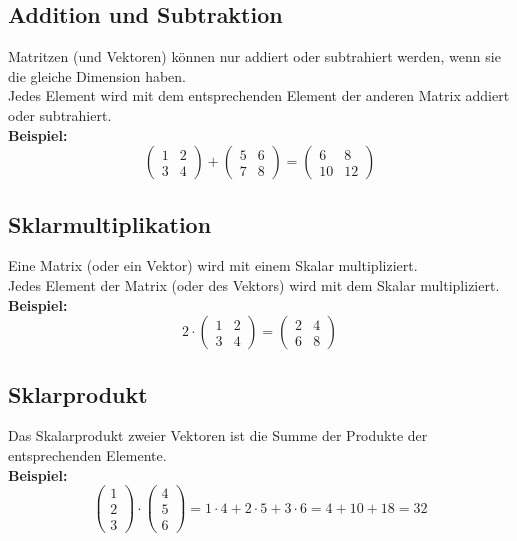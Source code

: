 \documentclass[12pt,a4paper]{article}
\begin{document}
\subsection{Addition und Subtraktion}
Matritzen (und Vektoren) können nur addiert oder subtrahiert werden, wenn sie die gleiche Dimension haben. \\
Jedes Element wird mit dem entsprechenden Element der anderen Matrix addiert oder subtrahiert. \\
\textbf{Beispiel:}
\[
\begin{pmatrix}
1 & 2 \\
3 & 4
\end{pmatrix}
+
\begin{pmatrix}
5 & 6 \\
7 & 8
\end{pmatrix}
=
\begin{pmatrix}
6 & 8 \\
10 & 12
\end{pmatrix}
\]

\subsection{Sklarmultiplikation}
Eine Matrix (oder ein Vektor) wird mit einem Skalar multipliziert. \\
Jedes Element der Matrix (oder des Vektors) wird mit dem Skalar multipliziert. \\
\textbf{Beispiel:}
\[
2 \cdot
\begin{pmatrix}
1 & 2 \\
3 & 4
\end{pmatrix}
=
\begin{pmatrix}
2 & 4 \\
6 & 8
\end{pmatrix}
\]

\subsection{Sklarprodukt}
Das Skalarprodukt zweier Vektoren ist die Summe der Produkte der entsprechenden Elemente. \\
\textbf{Beispiel:}
\[
\begin{pmatrix}
1 \\
2 \\
3
\end{pmatrix}
\cdot
\begin{pmatrix}
4 \\
5 \\
6
\end{pmatrix}
=
1 \cdot 4 + 2 \cdot 5 + 3 \cdot 6
=
4 + 10 + 18
=
32
\]
\end{document}
